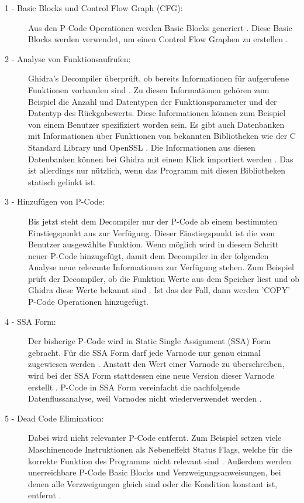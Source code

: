 
\begin{description}
\item [1 - Basic Blocks und Control Flow Graph (CFG):] Aus den P-Code Operationen werden Basic Blocks generiert \cite{8}. Diese Basic Blocks werden verwendet, um einen Control Flow Graphen zu erstellen \cite{8} \cite{9}.
\item [2 - Analyse von Funktionsaufrufen:] Ghidra's Decompiler überprüft, ob bereits Informationen für aufgerufene Funktionen vorhanden sind \cite{8}. Zu diesen Informationen gehören zum Beispiel die Anzahl und Datentypen der Funktionsparameter und der Datentyp des Rückgabewerts. Diese Informationen können zum Beispiel von einem Benutzer spezifiziert worden sein. Es gibt auch Datenbanken mit Informationen über Funktionen von bekannten Bibliotheken wie der C Standard Library und OpenSSL \cite{20}. Die Informationen aus diesen Datenbanken können bei Ghidra mit einem Klick importiert werden \cite{20}. Das ist allerdings nur nützlich, wenn das Programm mit diesen Bibliotheken statisch gelinkt ist.
\item [3 - Hinzufügen von P-Code:] Bis jetzt steht dem Decompiler nur der P-Code ab einem bestimmten Einstiegspunkt aus zur Verfügung. Dieser Einstiegspunkt ist die vom Benutzer ausgewählte Funktion. Wenn möglich wird in diesem Schritt neuer P-Code hinzugefügt, damit dem Decompiler in der folgenden Analyse neue relevante Informationen zur Verfügung stehen. Zum Beispiel prüft der Decompiler, ob die Funktion Werte aus dem Speicher liest und ob Ghidra diese Werte bekannt sind \cite{8}. Ist das der Fall, dann werden 'COPY' P-Code Operationen hinzugefügt.
\item [4 - SSA Form:] Der bisherige P-Code wird in Static Single Assignment (SSA) Form gebracht. Für die SSA Form darf jede Varnode nur genau einmal zugewiesen werden \cite{9}. Anstatt den Wert einer Varnode zu überschreiben, wird bei der SSA Form stattdessen eine neue Version dieser Varnode erstellt \cite{12}. P-Code in SSA Form vereinfacht die nachfolgende Datenflussanalyse, weil Varnodes nicht wiederverwendet werden \cite{12}.
\item [5 - Dead Code Elimination:] Dabei wird nicht relevanter P-Code entfernt. Zum Beispiel setzen viele Maschinencode Instruktionen als Nebeneffekt Status Flags, welche für die korrekte Funktion des Programms nicht relevant sind \cite{8}. Außerdem werden unerreichbare P-Code Basic Blocks und Verzweigungsanweisungen, bei denen alle Verzweigungen gleich sind oder die Kondition konstant ist, entfernt \cite{11}.

\end{description}
